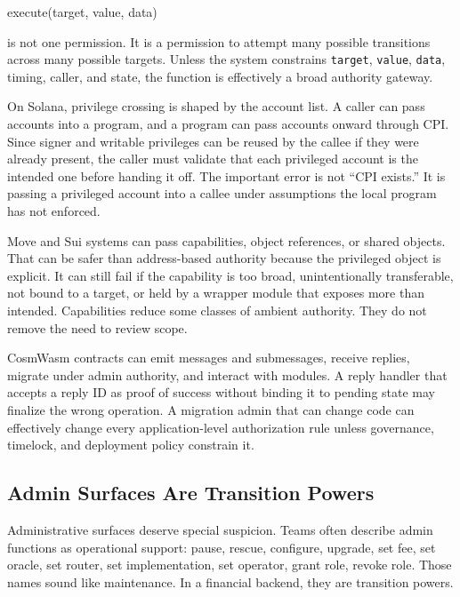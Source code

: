 \begin{codeblock}
execute(target, value, data)
\end{codeblock}

is not one permission. It is a permission to attempt many possible transitions across many possible targets. Unless the system constrains \texttt{target}, \texttt{value}, \texttt{data}, timing, caller, and state, the function is effectively a broad authority gateway.

On Solana, privilege crossing is shaped by the account list. A caller can pass accounts into a program, and a program can pass accounts onward through CPI. Since signer and writable privileges can be reused by the callee if they were already present, the caller must validate that each privileged account is the intended one before handing it off. The important error is not ``CPI exists.'' It is passing a privileged account into a callee under assumptions the local program has not enforced.

Move and Sui systems can pass capabilities, object references, or shared objects. That can be safer than address-based authority because the privileged object is explicit. It can still fail if the capability is too broad, unintentionally transferable, not bound to a target, or held by a wrapper module that exposes more than intended. Capabilities reduce some classes of ambient authority. They do not remove the need to review scope.

CosmWasm contracts can emit messages and submessages, receive replies, migrate under admin authority, and interact with modules. A reply handler that accepts a reply ID as proof of success without binding it to pending state may finalize the wrong operation. A migration admin that can change code can effectively change every application-level authorization rule unless governance, timelock, and deployment policy constrain it.

\subsection{Admin Surfaces Are Transition Powers}

Administrative surfaces deserve special suspicion. Teams often describe admin functions as operational support: pause, rescue, configure, upgrade, set fee, set oracle, set router, set implementation, set operator, grant role, revoke role. Those names sound like maintenance. In a financial backend, they are transition powers.

